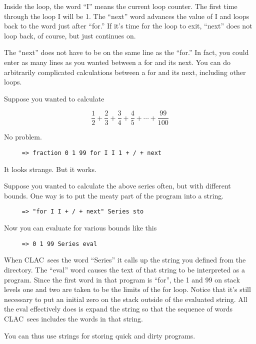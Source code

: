 \documentclass{report}
\newcommand{\CLAC}{CLAC}
\begin{document}
Inside the loop, the word ``I'' means the current loop counter. The first time through the loop I will be 1. The ``next'' word advances the value of I and loops back to the word just after ``for.'' If it's time for the loop to exit, ``next'' does not loop back, of course, but just continues on.

The ``next'' does not have to be on the same line as the ``for.'' In fact, you could enter as many lines as you wanted between a for and its next. You can do arbitrarily complicated calculations between a for and its next, including other loops.

Suppose you wanted to calculate

\begin{displaymath}
     \frac{1}{2} + \frac{2}{3} + \frac{3}{4} + \frac{4}{5} + \cdots +
       \frac{99}{100}
\end{displaymath}

No problem.

\begin{verbatim}
     => fraction 0 1 99 for I I 1 + / + next
\end{verbatim}

It looks strange. But it works.

Suppose you wanted to calculate the above series often, but with different bounds. One way is to put the meaty part of the program into a string.

\begin{verbatim}
     => "for I I + / + next" Series sto
\end{verbatim}

Now you can evaluate for various bounds like this

\begin{verbatim}
     => 0 1 99 Series eval
\end{verbatim}

When \CLAC\ sees the word ``Series'' it calls up the string you defined from the directory. The ``eval'' word causes the text of that string to be interpreted as a program. Since the first word in that program is ``for'', the 1 and 99 on stack levels one and two are taken to be the limits of the for loop. Notice that it's still necessary to put an initial zero on the stack outside of the evaluated string. All the eval effectively does is expand the string so that the sequence of words \CLAC\ sees includes the words in that string.

You can thus use strings for storing quick and dirty programs.
\end{document}
